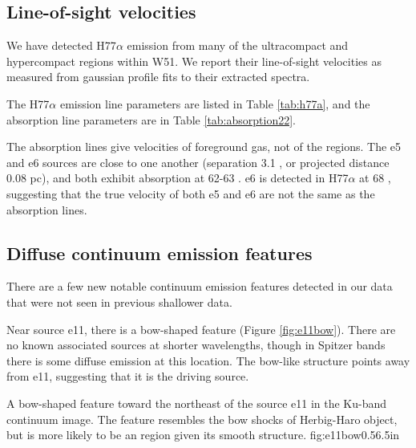 

\subsection{Line-of-sight velocities}
\label{sec:LOSvelo}
We have detected H77$\alpha$ emission from many of the ultracompact and
hypercompact \hii regions within W51.  We report their line-of-sight velocities
as measured from gaussian profile fits to their extracted spectra.

The H77$\alpha$ emission line parameters are listed in Table \ref{tab:h77a}, and
the \para \twotwo absorption line parameters are in Table \ref{tab:absorption22}.

The \formaldehyde absorption lines give velocities of foreground gas, not of
the \hii regions.  The e5 and e6 sources are close to one another (separation
3.1 \arcsec, or projected distance 0.08 pc), and both exhibit \formaldehyde
absorption at 62-63 \kms.  e6 is detected in H77$\alpha$ at 68 \kms, suggesting
that the true velocity of both e5 and e6 are not the same as the \formaldehyde
absorption lines. 






\subsection{Diffuse continuum emission features}
\label{sec:diffuseemission}
There are a few new notable continuum emission features detected in our data
that were not seen in previous shallower data.

Near source e11, there is a bow-shaped feature (Figure \ref{fig:e11bow}).
There are no known associated sources at shorter wavelengths, though in Spitzer
bands there is some diffuse emission at this location.  The bow-like structure
points away from e11, suggesting that it is the driving source.

{A bow-shaped feature toward the northeast of the source e11 in the Ku-band
continuum image.  The feature resembles the bow shocks of Herbig-Haro object,
but is more likely to be an \hii region given its smooth structure.}
{fig:e11bow}{0.5}{6.5in}

